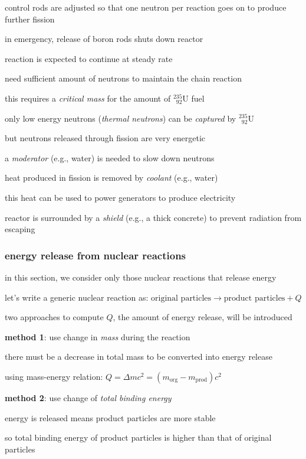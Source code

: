 control rods are adjusted so that one neutron per reaction goes on to produce further fission

in emergency, release of boron rods shuts down reactor

\cmt reaction is expected to continue at steady rate

need sufficient amount of neutrons to maintain the chain reaction

this requires a \emph{critical mass} for the amount of $^{235}_{\phantom{1}92}\text{U}$ fuel

\cmt only low energy neutrons (\emph{thermal neutrons}) can be \emph{captured} by $^{235}_{\phantom{1}92}\text{U}$

but neutrons released through fission are very energetic

a \emph{moderator} (e.g., water) is needed to slow down neutrons

\cmt heat produced in fission is removed by \emph{coolant} (e.g., water)

this heat can be used to power generators to produce electricity

\cmt reactor is surrounded by a \emph{shield} (e.g., a thick concrete) to prevent radiation from escaping

\subsubsection{energy release from nuclear reactions}

in this section, we consider only those nuclear reactions that release energy

let's write a generic nuclear reaction as: $\text{original particles} \longrightarrow \text{product particles} + Q$

two approaches to compute $Q$, the amount of energy release, will be introduced

\noindent \textbf{method 1}: use change in \emph{mass} during the reaction

there must be a decrease in total mass to be converted into energy release

using mass-energy relation: $Q=\Delta mc^2 = (m_\text{org} - m_\text{prod})c^2$

\noindent \textbf{method 2}: use change of \emph{total binding energy}

energy is released means product particles are more stable

so total binding energy of product particles is higher than that of original particles

